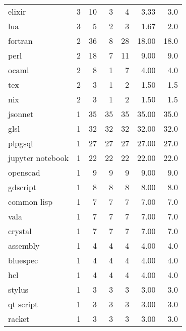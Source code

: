 \begin{tabular}{lrrrrrr}
elixir           &          3 &          10 &    3 &    4 &   3.33 &      3.0 \\
lua              &          3 &           5 &    2 &    3 &   1.67 &      2.0 \\
fortran          &          2 &          36 &    8 &   28 &  18.00 &     18.0 \\
perl             &          2 &          18 &    7 &   11 &   9.00 &      9.0 \\
ocaml            &          2 &           8 &    1 &    7 &   4.00 &      4.0 \\
tex              &          2 &           3 &    1 &    2 &   1.50 &      1.5 \\
nix              &          2 &           3 &    1 &    2 &   1.50 &      1.5 \\
jsonnet          &          1 &          35 &   35 &   35 &  35.00 &     35.0 \\
glsl             &          1 &          32 &   32 &   32 &  32.00 &     32.0 \\
plpgsql          &          1 &          27 &   27 &   27 &  27.00 &     27.0 \\
jupyter notebook &          1 &          22 &   22 &   22 &  22.00 &     22.0 \\
openscad         &          1 &           9 &    9 &    9 &   9.00 &      9.0 \\
gdscript         &          1 &           8 &    8 &    8 &   8.00 &      8.0 \\
common lisp      &          1 &           7 &    7 &    7 &   7.00 &      7.0 \\
vala             &          1 &           7 &    7 &    7 &   7.00 &      7.0 \\
crystal          &          1 &           7 &    7 &    7 &   7.00 &      7.0 \\
assembly         &          1 &           4 &    4 &    4 &   4.00 &      4.0 \\
bluespec         &          1 &           4 &    4 &    4 &   4.00 &      4.0 \\
hcl              &          1 &           4 &    4 &    4 &   4.00 &      4.0 \\
stylus           &          1 &           3 &    3 &    3 &   3.00 &      3.0 \\
qt script        &          1 &           3 &    3 &    3 &   3.00 &      3.0 \\
racket           &          1 &           3 &    3 &    3 &   3.00 &      3.0 \\

\end{tabular}
